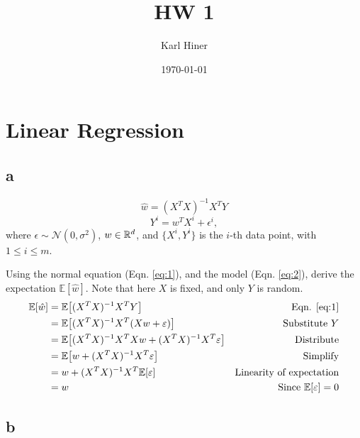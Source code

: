 \documentclass{article}
\title{HW 1}
\author{Karl Hiner}
\date{\today}
\begin{document}
\maketitle	

\section{Linear Regression}

\subsection{a}

\begin{equation} \label{eq:1}
    \hat{w} = (X^TX)^{-1}X^TY
\end{equation}
\begin{equation} \label{eq:2}
    Y^i = w^T X^i + \epsilon^i,
\end{equation}
where $\epsilon \sim \mathcal{N}(0, \sigma^2)$, $w \in \mathbb{R}^d$, and $\{X^i, Y^i\}$ is the $i$-th data point, with $1 \leq i \leq m$.

Using the normal equation (Eqn. \ref{eq:1}), and the model (Eqn. \ref{eq:2}), derive the expectation $\mathbb{E}\left[\hat{w}\right]$.
Note that here $X$ is fixed, and only $Y$ is random.
\begin{align*}
    \mathbb{E}\left[\hat{w}\right] &= \mathbb{E}\left[(X^TX)^{-1}X^TY\right]&\text{Eqn. \ref{eq:1}}\\
    &= \mathbb{E}\left[(X^TX)^{-1}X^T\left(Xw + \epsilon\right)\right]&\text{Substitute $Y$}\\
    &= \mathbb{E}\left[(X^TX)^{-1}X^TXw + (X^TX)^{-1}X^T\epsilon\right]&\text{Distribute}\\
    &= \mathbb{E}\left[w + (X^TX)^{-1}X^T\epsilon\right]&\text{Simplify}\\
    &= w + (X^TX)^{-1}X^T\mathbb{E}\left[\epsilon\right]&\text{Linearity of expectation}\\
    &= w&\text{Since $\mathbb{E}\left[\epsilon\right] = 0$}
\end{align*}

\subsection{b}
\end{document}

